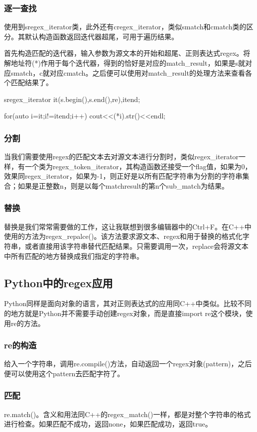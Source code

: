 \documentclass[a4papaer,utf8,12pt,draft,titlepage]{ctexart}
\begin{document}
				\subsubsection{逐一查找}
					使用到sregex\_iterator类，此外还有cregex\_iterator，类似smatch和cmatch类的区分。其默认构造函数返回迭代器超尾，可用于遍历结果。
					
					首先构造匹配的迭代器，输入参数为源文本的开始和超尾、正则表达式regex。将解地址符(*)作用于每个迭代器，得到的恰好是对应的match\_result，如果是s就对应smatch，c就对应cmatch。之后便可以使用对match\_result的处理方法来查看各个匹配结果了。
					
					sregex\_iterator it(s.begin(),s.end(),re),itend;
					
					for(auto i=it;i!=itend;i++){
						cout<<(*i).str()<<endl;
					}
				\subsubsection{分割}
					当我们需要使用regex的匹配文本去对源文本进行分割时，类似regex\_iterator一样，有一个类为regex\_token\_iterator，其构造函数还接受一个flag值，如果为0，效果同regex\_iterator，如果为-1，则正好是以所有匹配字符串为分割的字符串集合；如果是正整数n，则是以每个matchresult的第n个sub\_match为结果。
				\subsubsection{替换}
					替换是我们常常需要做的工作，这让我联想到很多编辑器中的Ctrl+F。在C++中使用的方法为regex\_repalce()。该方法要求源文本、regex和用于替换的格式化字符串，或者直接用该字符串替代匹配结果。只需要调用一次，replace会将源文本中所有匹配的地方替换成我们指定的字符串。
					
			\subsection{Python中的regex应用}
				Python同样是面向对象的语言，其对正则表达式的应用同C++中类似。比较不同的地方就是Python并不需要手动创建regex对象，而是直接import re这个模块，使用re的方法。
				\subsubsection{re的构造}
					给入一个字符串，调用re.compile()方法，自动返回一个regex对象(pattern)，之后便可以使用这个pattern去匹配字符了。
				\subsubsection{匹配}
					re.match()。含义和用法同C++的regex\_match()一样，都是对整个字符串的格式进行检查。如果匹配不成功，返回none，如果匹配成功，返回true。
\end{document}

